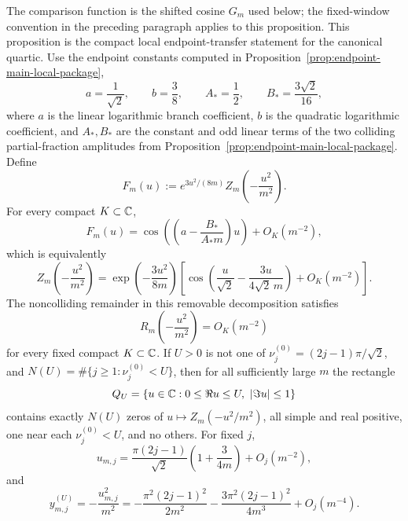\begin{proposition}\label{prop:fixed-window-endpoint-isolation}
The comparison function is the shifted cosine $G_m$ used below; the fixed-window convention in the preceding paragraph applies to this proposition.
This proposition is the compact local endpoint-transfer statement for the canonical quartic.  Use the endpoint constants computed in Proposition~\ref{prop:endpoint-main-local-package},
\begin{equation}\label{eq:main-endpoint-constant-handoff}
a=\frac1{\sqrt2},\qquad b=\frac38,
\qquad A_*=\frac12,
\qquad B_*=\frac{3\sqrt2}{16},
\end{equation}
where $a$ is the linear logarithmic branch coefficient, $b$ is the quadratic logarithmic coefficient, and $A_*,B_*$ are the constant and odd linear terms of the two colliding partial-fraction amplitudes from Proposition~\ref{prop:endpoint-main-local-package}.
Define
\[
F_m(u):=e^{3u^2/(8m)}Z_m\!\left(-\frac{u^2}{m^2}\right).
\]
For every compact $K\subset\mathbb{C}$,
\begin{equation}\label{eq:quartic-corollary-cosine}
F_m(u)=\cos\!\left(\left(a-\frac{B_*}{A_*m}\right)u\right)+O_K(m^{-2}),
\end{equation}
which is equivalently
\begin{equation}\label{eq:endpoint-scaling-normalized}
Z_m\!\left(-\frac{u^2}{m^2}\right)=
\exp\!\left(-\frac{3u^2}{8m}\right)
\left[\cos\!\left(\frac{u}{\sqrt2}-\frac{3u}{4\sqrt2\,m}\right)+O_K(m^{-2})\right].
\end{equation}
The noncolliding remainder in this removable decomposition satisfies
\[
R_m\!\left(-\frac{u^2}{m^2}\right)=O_K(m^{-2})
\]
for every fixed compact $K\subset\mathbb{C}$.  If $U>0$ is not one of
$\nu_j^{(0)}=(2j-1)\pi/\sqrt2$, and $N(U)=\#\{j\ge1:\nu_j^{(0)}<U\}$, then for all sufficiently large $m$ the rectangle
\[
Q_U=\{u\in\mathbb{C}:0\le \Re u\le U,
\ |\Im u|\le1\}
\]
contains exactly $N(U)$ zeros of $u\mapsto Z_m(-u^2/m^2)$, all simple and real positive, one near each $\nu_j^{(0)}<U$, and no others.  For fixed $j$,
\begin{equation}\label{eq:quartic-u-location}
u_{m,j}=\frac{\pi(2j-1)}{\sqrt2}\left(1+\frac{3}{4m}\right)+O_j(m^{-2}),
\end{equation}
and
\begin{equation}\label{eq:quartic-y-location-local}
y_{m,j}^{(U)}=-\frac{u_{m,j}^2}{m^2}
=-\frac{\pi^{2}(2j-1)^2}{2m^2}-\frac{3\pi^{2}(2j-1)^2}{4m^3}+O_j(m^{-4}).
\end{equation}
\end{proposition}
